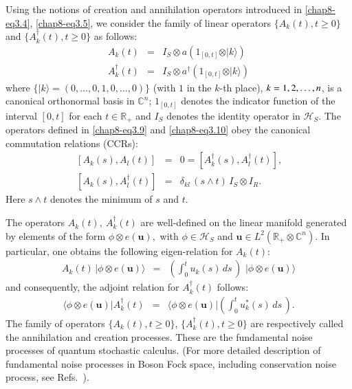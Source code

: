 Using the notions of creation and annihilation operators introduced in \eqref{chap8-eq3.4}, \eqref{chap8-eq3.5}, we consider the family of linear operators  
$\{A_k(t), t\geq 0\}$ and  $\{A^\dag_k(t), t\geq 0\}$ as follows: 
\begin{eqnarray}
A_k(t)&=&I_S \otimes a \left (1_{[0,t]}  \otimes \vert k\rangle \right ) \label{chap8-eq3.9} \\
A^\dagger_k(t) &=& I_S \otimes a^{\dagger} \left (1_{[0,t]}  \otimes \vert k\rangle \right )  \label{chap8-eq3.10} 
\end{eqnarray}
where $\{\vert k\rangle = (0, \ldots, 0, 1,0,\ldots,0)\}$ (with $1$ in the $k$-th place), $k=1,2,\break\ldots, n$, is  a canonical orthonormal basis in $\mathbb{C}^n $;   $1_{[0,t]}$ denotes the indicator function of the interval $[0,t]$ for each $t\in\mathbb{R}_+$ and $I_S$  denotes the identity operator in $\mathcal{H}_S$. The operators defined in \eqref{chap8-eq3.9} and \eqref{chap8-eq3.10} obey the canonical commutation relations (CCRs): 
\begin{eqnarray}
\, [A_k(s),A_l(t)]&=&0=[A^\dag_k(s),A^\dag_l(t)], \label{chap8-eq3.11} \\   
\, [A_k (s),A^\dag_l(t)]&=&\delta_{kl}\, (s \wedge t)\, I_S\otimes I_R. \label{chap8-eq3.12}
\end{eqnarray}
Here $s\wedge t$ denotes the minimum of $s$ and $t$. 

The operators $A_k(t),\ A^\dag_k(t)$ are well-defined on the linear manifold generated by elements of the form $\phi 
\otimes e (\mathbf{u}),$ with $\phi \in \mathcal{H}_S$ and $\mathbf{u} \in L^2(\mathbb{R}_+\otimes \mathbb{C}^n)$. In particular, one obtains the following eigen-relation for $A_k(t)$: 
\begin{eqnarray} 
A_k(t)\,  \vert \phi \otimes e(\mathbf{u})\rangle &=& \left(\int_{0}^{t} u_k(s)\, ds\, \right)\, \,\vert\phi \otimes e(\mathbf{u})\rangle \label{chap8-eq3.13}
\end{eqnarray} 
and consequently, the adjoint relation for $A^\dag_k(t)$ follows: 
\begin{eqnarray} 
\langle \phi \otimes e(\mathbf{u})  \vert A^\dag_k(t) &=& \langle \phi \otimes e(\mathbf{u})  \vert \left(\int_{0}^{t} u^*_k(s)\, ds\, \right). \label{chap8-eq3.14}
\end{eqnarray}
The family of operators $\{A_k(t), t\geq 0\}$, $\{A^\dag_k(t), t\geq 0\}$ are respectively called the annihilation and creation processes. These are the fundamental noise processes of quantum stochastic calculus. (For more detailed description of fundamental noise processes in Boson Fock space, including conservation noise process, see Refs.~\cite{chap8-key7, chap8-key8}).  


